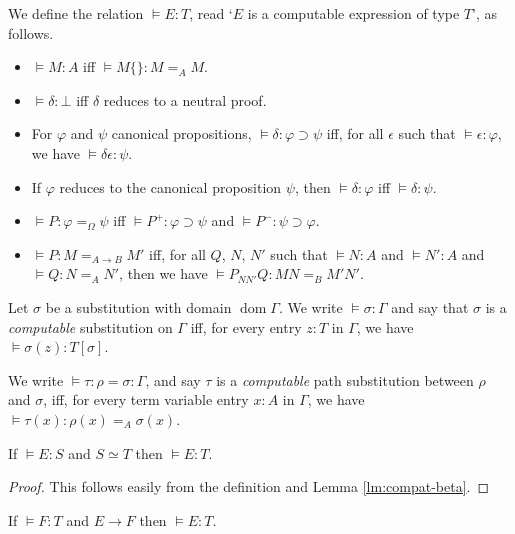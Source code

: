 \documentclass[a4paper,UKenglish]{lipics-v2016}
\newcommand*{\dom}{\ensuremath{\operatorname{dom}}}
\theoremstyle{plain}
\theoremstyle{definition}
\begin{document}
\begin{definition}
We define the relation $\models E : T$, read `$E$ is a computable expression of type $T$', as follows.
\begin{itemize}
\item
$\models M : A$ iff $\models M \{\} : M =_A M$.
\item
$\models \delta : \bot$ iff $\delta$ reduces to a neutral proof.
\item
For $\varphi$ and $\psi$ canonical propositions, $\models \delta : \varphi \supset \psi$ iff, for all $\epsilon$ such that $\models \epsilon : \varphi$, we have $\models \delta \epsilon : \psi$.
\item
If $\varphi$ reduces to the canonical proposition $\psi$, then $\models \delta : \varphi$ iff $\models \delta : \psi$.
\item
$\models P : \varphi =_\Omega \psi$ iff $\models P^+ : \varphi \supset \psi$ and $\models P^- : \psi \supset \varphi$.
\item
$\models P : M =_{A \rightarrow B} M'$ iff, for all $Q$, $N$, $N'$ such that $\models N : A$ and $\models N' : A$ and $\models Q : N =_A N'$, then we have $\models P_{NN'}Q : MN =_B M'N'$.
\end{itemize}
\end{definition}

\begin{definition}
Let $\sigma$ be a substitution with domain $\dom \Gamma$.  We write $\models \sigma : \Gamma$ and say that
$\sigma$ is a \emph{computable} substitution on $\Gamma$ iff, for every entry $z : T$ in $\Gamma$, we have $\models \sigma(z) : T [ \sigma ]$.

We write $\models \tau : \rho = \sigma : \Gamma $, and say $\tau$ is a \emph{computable} path substitution between $\rho$ and $\sigma$, iff, for every term variable entry $x : A$ in $\Gamma$, we have $\models \tau(x) : \rho(x) =_A \sigma(x)$.
\end{definition}

\begin{lemma}[Conversion]
\label{lm:conv-compute}
If $\models E : S$ and $S \simeq T$ then $\models E : T$.
\end{lemma}

\begin{proof}
This follows easily from the definition and Lemma \ref{lm:compat-beta}.
\end{proof}

\begin{lemma}[Expansion]
\label{lm:expansion}
If $\models F : T$ and $E \rightarrow F$ then $\models E : T$.
\end{lemma}
\end{document}
